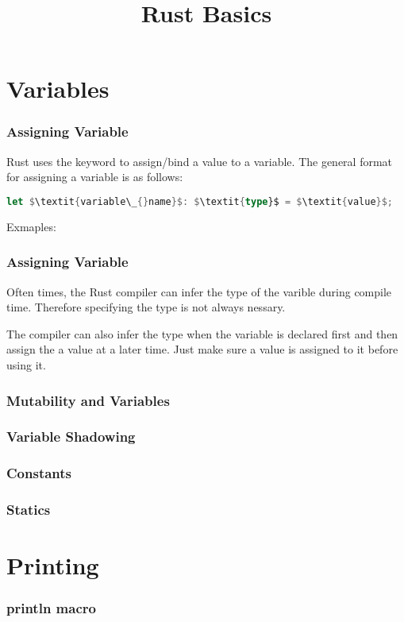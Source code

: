 \documentclass{beamer}
\title{Rust Basics}
\begin{document}
\begin{frame}
  \titlepage{}
\end{frame}

\section{Variables}
\begin{frame}[fragile]
  \frametitle{Assigning Variable}
  Rust uses the  keyword to assign/bind a value to a variable. The general format for assigning a variable is as follows:

\begin{lstlisting}[mathescape=true, language=Rust]
let $\textit{variable\_{}name}$: $\textit{type}$ = $\textit{value}$;
\end{lstlisting}

  Exmaples:
  
\end{frame}

\begin{frame}[fragile]
  \frametitle{Assigning Variable}
  Often times, the Rust compiler can infer the type of the varible during compile time. Therefore specifying the type is not always nessary.
  

  The compiler can also infer the type when the variable is declared first and then assign the a value at a later time. Just make sure a value is assigned to it before using it.
  
\end{frame}

\begin{frame}
  \frametitle{Mutability and Variables}
\end{frame}

\begin{frame}
  \frametitle{Variable Shadowing}
\end{frame}

\begin{frame}
  \frametitle{Constants}
\end{frame}

\begin{frame}
  \frametitle{Statics}
\end{frame}

\section{Printing}
\begin{frame}
  \frametitle{println macro}
\end{frame}
\end{document}
